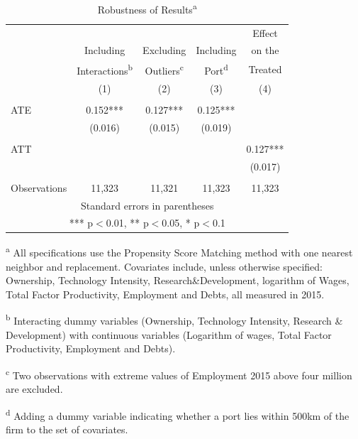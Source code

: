 \documentclass[a4paper,11pt]{scrartcl}
\begin{document}
 \begin{table}

  \centering
   \caption{Robustness of Results\textsuperscript{a}}

\begin{tabular}{lcccc} \hline
 & & & & Effect \\
 & Including & Excluding & Including & on the\\
 & Interactions\textsuperscript{b} & Outliers\textsuperscript{c} & Port\textsuperscript{d} & Treated \\
 & (1) & (2) & (3) & (4) \\ \hline
 &  &  &  &  \\
ATE & 0.152*** & 0.127*** & 0.125*** &  \\
 & (0.016) & (0.015) & (0.019) &  \\
 &  &  &  &  \\
 ATT &  &  &  & 0.127*** \\
 &   &  &  & (0.017) \\
 &  &  &  &  \\
 Observations & 11,323 & 11,321 & 11,323 & 11,323 \\ \hline
\multicolumn{5}{c}{ Standard errors in parentheses} \\
\multicolumn{5}{c}{ *** p$<$0.01, ** p$<$0.05, * p$<$0.1} \\
\end{tabular}
   \begin{tablenotes}
      \tiny
	\item\textsuperscript{a} All specifications use the Propensity Score Matching method with one nearest neighbor and replacement. 	Covariates include, unless otherwise specified: Ownership, Technology Intensity, Research\&Development, logarithm of Wages, Total Factor Productivity, Employment and Debts, all measured in 2015. 
	\item\textsuperscript{b} Interacting dummy variables (Ownership, Technology Intensity, Research \& Development) with continuous variables (Logarithm of wages, Total Factor Productivity, Employment and Debts).  
	\item\textsuperscript{c} Two observations with extreme values of Employment 2015 above four million are excluded. 
	\item\textsuperscript{d} Adding a dummy variable indicating whether a port lies within 500km of the firm to the set of covariates.
	\end{tablenotes}
\end{table}
\end{document}
